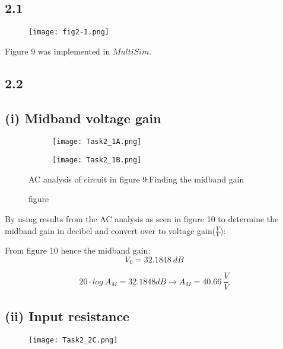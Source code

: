\subsection*{2.1}
    \begin{figure}[h!]
        \centering
        \texttt{[image: fig2-1.png]}
    \end{figure}    

Figure 9 was implemented in $MultiSim$.

\subsection*{2.2}
  \subsection*{(i) Midband voltage gain}

	\begin{figure}[h]
        \centering
        \begin{subfigure}[h]{0.7\textwidth}
                \texttt{[image: Task2\_1A.png]}
                \label{fig:HJÖRLEIFUR}
        \end{subfigure}
        \begin{subfigure}[h]{0.25\textwidth}
                \texttt{[image: Task2\_1B.png]}
                \label{fig:LÁRUS}
        \end{subfigure}
        \caption{figure}{AC analysis of circuit in figure 9:Finding the midband gain}
	\end{figure}

    By using results from the AC analysis as seen in figure 10 to determine the midband gain in decibel and convert over to voltage gain($\frac{V}{V}$):

   	From figure 10 hence the midband gain:
   	$$ V_{0} = 32.1848 \ dB $$ 

   	$$ 20 \cdot log{\ A_{M}} = 32.1848 dB \rightarrow A_{M} = 40.66\  \frac{V}{V} $$



	\subsection*{(ii) Input resistance}
    \begin{figure}[h!]
        \centering
        \texttt{[image: Task2\_2C.png]}
    \end{figure}  

